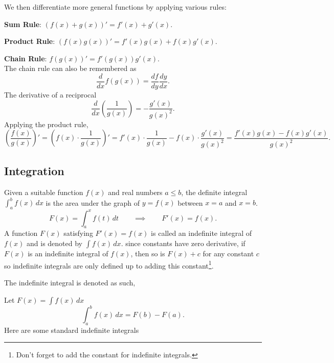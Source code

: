 \documentclass[10pt, a4paper]{article}
\begin{document}
We then differentiate more general functions by applying various rules:

\textbf{Sum Rule}: $(f(x) + g(x))' = f'(x) + g'(x)$.

\textbf{Product Rule}: $(f(x)g(x))' = f'(x)g(x) + f(x)g'(x)$.

\textbf{Chain Rule}: $f(g(x))' = f'(g(x))g'(x)$. \\

The chain rule can also be remembered as 
\[
\frac{d}{dx}f(g(x)) = \frac{df}{dy}\frac{dy}{dx}.
\]
The derivative of a reciprocal
\[
\frac{d}{dx}\left(\frac{1}{g(x)}\right) = -\frac{g'(x)}{g(x) ^ 2}.
\]
Applying the product rule,
\[
\left(\frac{f(x)}{g(x)}\right)' = \left(f(x) \cdot \frac{1}{g(x)}\right)' = f'(x) \cdot \frac{1}{g(x)} - f(x) \cdot \frac{g'(x)}{g(x) ^ 2} = \frac{f'(x)g(x) - f(x)g'(x)}{g(x) ^ 2}.
\]

\subsection{Integration}
Given a suitable function $f(x)$ and real numbers $a \leq b$, the definite integral $\displaystyle\int_{a}^{b}f(x)\,dx$ is the area under the graph of $y = f(x)$ between $x = a$ and $x = b$. \\
\[
F(x) = \int_{a}^{x}f(t)\,dt\qquad\implies\qquad F'(x) = f(x).
\]
A function $F(x)$ satisfying $F'(x) = f(x)$ is called an indefinite integral of $f(x)$ and is denoted by $\displaystyle\int f(x)\,dx$. since constants have zero derivative, if $F(x)$ is an indefinite integral of $f(x)$, then so is $F(x) + c$ for any constant $c$ so indefinite integrals are only defined up to adding this constant\footnote{Don't forget to add the constant for indefinite integrals.}.

The indefinite integral is denoted as such,

Let $\displaystyle F(x) = \int f(x)\,dx$
\[
\int_{a}^{b}f(x)\,dx = F(b) - F(a).
\]
Here are some standard indefinite integrals
\end{document}
